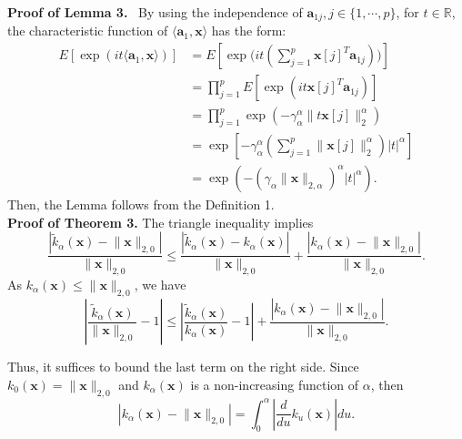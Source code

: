 \documentclass[journal,onecolumn]{IEEEtran}
\begin{document}
\noindent
{\bf Proof of Lemma 3.}\,\,\, By using the independence of $\mathbf{a}_{1j}, j\in\{1,\cdots,p\}$, for $t\in \mathbb{R}$, the characteristic function of $\langle \mathbf{a}_1,\mathbf{x}\rangle$ has the form: \begin{align*}
E[\exp(it\langle \mathbf{a}_1,\mathbf{x}\rangle)]&=E\left[\exp\Big(it(\sum_{j=1}^p\mathbf{x}[j]^T\mathbf{a}_{1j})\Big)\right]\\
&=\prod_{j=1}^p E[\exp(it\mathbf{x}[j]^T\mathbf{a}_{1j})]\\
&=\prod_{j=1}^p \exp(-\gamma_\alpha^{\alpha}\lVert t\mathbf{x}[j]\rVert_2^\alpha)\\
&=\exp\left[-\gamma_\alpha^{\alpha}\left(\sum_{j=1}^p\lVert\mathbf{x}[j]\rVert_2^\alpha\right)|t|^{\alpha}\right]\\
&=\exp(-(\gamma_\alpha\lVert\mathbf{x}\rVert_{2,\alpha})^\alpha|t|^\alpha).
\end{align*}
Then, the Lemma follows from the Definition 1.\\

\noindent
{\bf Proof of Theorem 3.} The triangle inequality implies $$
\frac{|\tilde{k}_{\alpha}(\mathbf{x})-\lVert\mathbf{x}\rVert_{2,0}|}{\lVert\mathbf{x}\rVert_{2,0}}\leq \frac{|\tilde{k}_{\alpha}(\mathbf{x})-k_{\alpha}(\mathbf{x})|}{\lVert\mathbf{x}\rVert_{2,0}}+\frac{|k_{\alpha}(\mathbf{x})-\lVert\mathbf{x}\rVert_{2,0}|}{\lVert\mathbf{x}\rVert_{2,0}}.
$$
As $k_{\alpha}(\mathbf{x})\leq \lVert\mathbf{x}\rVert_{2,0}$, we have $$
\left|\frac{\tilde{k}_{\alpha}(\mathbf{x})}{\lVert\mathbf{x}\rVert_{2,0}}-1\right|\leq \left|\frac{\tilde{k}_{\alpha}(\mathbf{x})}{k_{\alpha}(\mathbf{x})}-1\right|+\frac{|k_{\alpha}(\mathbf{x})-\lVert\mathbf{x}\rVert_{2,0}|}{\lVert\mathbf{x}\rVert_{2,0}}.
$$

Thus, it suffices to bound the last term on the right side. Since $k_0(\mathbf{x})= \lVert\mathbf{x}\rVert_{2,0}$ and $k_{\alpha}(\mathbf{x})$ is a non-increasing function of $\alpha$, then $$
|k_{\alpha}(\mathbf{x})-\lVert\mathbf{x}\rVert_{2,0}|=\int_{0}^{\alpha}\left|\frac{d}{du}k_{u}(\mathbf{x})\right|du.
$$
\end{document}
